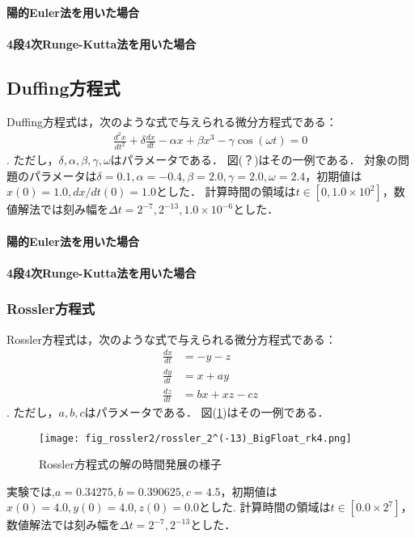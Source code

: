 \paragraph*{陽的Euler法を用いた場合}

\paragraph*{4段4次Runge-Kutta法を用いた場合}

\subsection{Duffing方程式}
Duffing方程式は，次のような式で与えられる微分方程式である：
\begin{align}
    \frac{d^2 x}{dt^2} + \delta\frac{dx}{dt} - \alpha x + \beta x^3 - \gamma \cos(\omega t) = 0
\end{align}.
ただし，$\delta,\alpha,\beta,\gamma,\omega$はパラメータである．
図(？)はその一例である．
対象の問題のパラメータは$\delta=0.1, \alpha=-0.4, \beta=2.0, \gamma=2.0, \omega=2.4$，初期値は$x(0) = 1.0, dx/dt(0) = 1.0$とした．
計算時間の領域は$t \in [0,1.0 \times 10^2]$，数値解法では刻み幅を$\Delta t =  2^{-7}, 2^{-13}, 1.0 \times 10^{-6}$とした．
\paragraph*{陽的Euler法を用いた場合}

\paragraph*{4段4次Runge-Kutta法を用いた場合}

\subsubsection{Rossler方程式}
Rossler方程式は，次のような式で与えられる微分方程式である：
\begin{align}
    \frac{dx}{dt} &= -y-z \\
    \frac{dy}{dt} &= x+ay \\
    \frac{dz}{dt} &= bx + xz - cz
\end{align}.
ただし，$a,b,c$はパラメータである．
図(\ref{fig:rossler})はその一例である．
\begin{figure}[H]
    \centering
    \texttt{[image: fig\_rossler2/rossler\_2^(-13)\_BigFloat\_rk4.png]}
    \caption{Rossler方程式の解の時間発展の様子}
    \label{fig:rossler}
\end{figure}
実験では,$a=0.34275, b=0.390625, c=4.5$，初期値は$x(0) = 4.0, y(0) = 4.0, z(0) = 0.0$とした.
計算時間の領域は$t \in [0.0 \times 2^7]$，数値解法では刻み幅を$\Delta t =   2^{-7},2^{-13}$とした．
